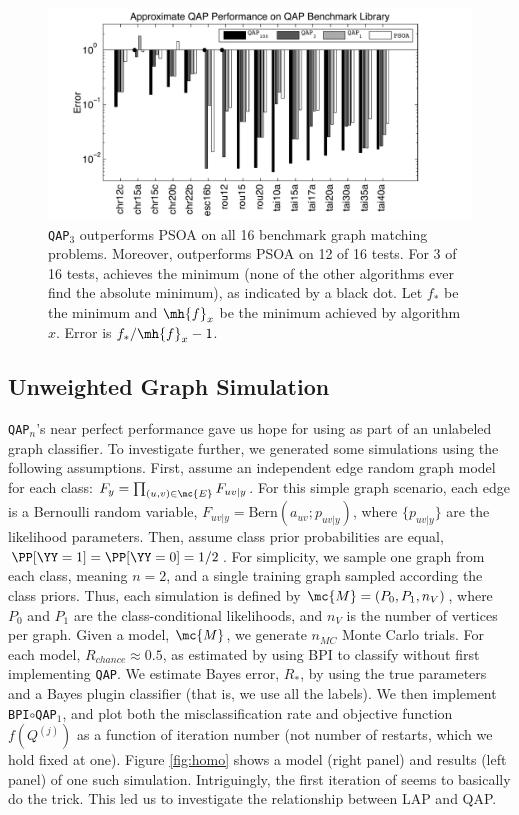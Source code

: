 \documentclass[10pt,journal,cspaper,compsoc]{IEEEtran}
\begin{document}
\begin{figure}[htbp]
	\centering			
	\includegraphics[width=1.0\linewidth]{../figs/benchmarks.pdf}
	\caption{\texttt{QAP}$_3$ outperforms PSOA on all 16 benchmark graph matching problems.  Moreover, \qapa outperforms PSOA on 12 of 16 tests.  For 3 of 16 tests, \qapb achieves the minimum (none of the other algorithms ever find the absolute minimum), as indicated by a black dot.  Let $f_*$ be the minimum and $\mh{f}_x$ be the minimum achieved by algorithm $x$.  Error is $f_*/\mh{f}_x-1$.  }
	\label{fig:fwpath}
\end{figure}




\subsection{Unweighted Graph Simulation}

\texttt{QAP}$_n$'s near perfect performance gave us hope for using \qap as part of an unlabeled graph classifier.  To investigate further, we generated some simulations using the following assumptions.  First, assume an independent edge random graph model for each class: $F_y=\prod_{(u,v) \in \mc{E}} F_{uv|y}$.  For this simple graph scenario, each edge is a Bernoulli random variable, $F_{uv|y}=\text{Bern}(a_{uv}; p_{uv|y})$, where $\{p_{uv|y}\}$ are the likelihood parameters.  Then, assume class prior probabilities are equal, $\PP[\YY=1]=\PP[\YY=0]=1/2$.  For simplicity, we sample one graph from each class, meaning $n=2$, and a single training graph sampled according the class priors. Thus, each simulation is defined by $\mc{M}=(P_0,P_1,n_V)$, where $P_0$ and $P_1$ are the class-conditional likelihoods, and $n_V$ is the number of vertices per graph.  Given a model, $\mc{M}$, we generate $n_{MC}$ Monte Carlo trials.  For each model, $R_{chance}\approx 0.5$, as estimated by using BPI to classify without first implementing \texttt{QAP}.  We estimate Bayes error, $R_*$, by using the true parameters and a Bayes plugin classifier (that is, we use all the labels).  We then implement \texttt{BPI}$\circ$\texttt{QAP}$_1$, and plot both the misclassification rate and objective function $f(Q^{(j)})$ as a function of iteration number (not number of restarts, which we hold fixed at one). Figure \ref{fig:homo} shows a model (right panel) and results (left panel) of one such simulation. Intriguingly, the first iteration of \qapa seems to basically do the trick.  This led us to investigate the relationship between LAP and QAP.
\end{document}
